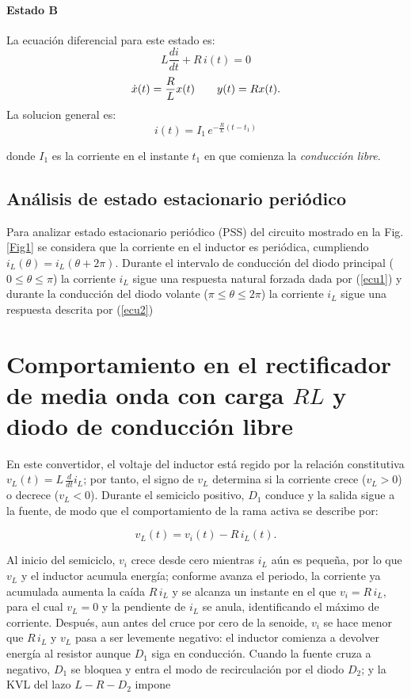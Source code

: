 \documentclass[conference]{IEEEtran}
\begin{document}
\paragraph{Estado B}
La ecuación diferencial para este estado es:
\[
L\frac{di}{dt} + R\,i(t) = 0
\]
\[
\dot{x}(t)
=
\-\dfrac{R}{L}
x(t)
\qquad
y(t)=Rx(t).
\]
La solucion general es:
\begin{equation}
i(t)=I_1\,e^{-\frac{R}{L}(t-t_1)}
\label{ecu2}
\end{equation}

donde \(I_1\) es la corriente en el instante \(t_1\) en que comienza la \emph{conducción libre}.
\subsection{Análisis de estado estacionario periódico}
Para analizar estado estacionario periódico (PSS) del circuito mostrado en la Fig. \ref{Fig1} se considera que la corriente en el inductor
es periódica, cumpliendo $i_L(\theta)=i_L(\theta+2\pi)$. Durante el intervalo de conducción del diodo principal ($0 \leq \theta \leq \pi$) la corriente $i_L$ sigue una respuesta natural forzada
dada por (\ref{ecu1}) y durante la conducción del diodo volante ($\pi \leq \theta \leq 2\pi$) la corriente $i_L$ sigue una respuesta descrita por (\ref{ecu2})

\section{Comportamiento en el rectificador de media onda con carga $RL$ y diodo de conducción libre}
En este convertidor, el voltaje del inductor está regido por la relación constitutiva $v_L(t)=L\,\tfrac{d}{dt}i_L$; por tanto, el signo de $v_L$ determina si la corriente crece ($v_L>0$) o decrece ($v_L<0$). Durante el semiciclo positivo, $D_1$ conduce y la salida sigue a la fuente, de modo que el comportamiento de la rama activa se describe por:

\begin{equation*}
	v_L(t)=v_i(t)-R\,i_L(t).
\end{equation*}

Al inicio del semiciclo, $v_i$ crece desde cero mientras $i_L$ aún es pequeña, por lo que $v_L$ y el inductor acumula energía; conforme avanza el periodo, la corriente ya acumulada aumenta la caída $R\,i_L$ y se alcanza un instante en el que $v_i=R\,i_L$, para el cual $v_L=0$ y la pendiente de $i_L$ se anula, identificando el máximo de corriente. Después, aun antes del cruce por cero de la senoide, $v_i$ se hace menor que $R\,i_L$ y $v_L$ pasa a ser levemente negativo: el inductor comienza a devolver energía al resistor aunque $D_1$ siga en conducción. Cuando la fuente cruza a negativo, $D_1$ se bloquea y entra el modo de recirculación por el diodo $D_2$; y la KVL del lazo $L\!-\!R\!-\!D_2$ impone
\end{document}
